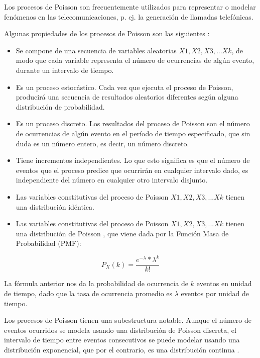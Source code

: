 Los procesos de Poisson son frecuentemente utilizados para representar o modelar fenómenos en las telecomunicaciones, p. ej. la generación de llamadas telefónicas.\newline

Algunas propiedades de los procesos de Poisson son las siguientes \parencite{ PoissonMedium}:

\begin{itemize}
    \item Se compone de una secuencia de variables aleatorias $X1, X2, X3, ... Xk$, de modo que cada variable representa el número de ocurrencias de algún evento, durante un intervalo de tiempo.
    \item Es un proceso estocástico. Cada vez que ejecuta el proceso de Poisson, producirá una secuencia de resultados aleatorios diferentes según alguna distribución de probabilidad.
    \item Es un proceso discreto. Los resultados del proceso de Poisson son el número de ocurrencias de algún evento en el período de tiempo especificado, que sin duda es un número entero, es decir, un número discreto.
    \item Tiene incrementos independientes. Lo que esto significa es que el número de eventos que el proceso predice que ocurrirán en cualquier intervalo dado, es independiente del número en cualquier otro intervalo disjunto.
    \item Las variables constitutivas del proceso de Poisson $X1, X2, X3, ... Xk$ tienen una distribución idéntica.
    \item Las variables constitutivas del proceso de Poisson $X1, X2, X3, ... Xk$ tienen una distribución de Poisson , que viene dada por la Función Masa de Probabilidad (PMF):
\end{itemize}

\begin{equation}
    P_{X}(k)=\frac{e^{-\lambda}*\lambda ^{k}}{k!}
    \label{eqn:Poisson}
\end{equation}

La fórmula anterior nos da la probabilidad de ocurrencia de $k$ eventos en unidad de tiempo, dado que la tasa de ocurrencia promedio es $\lambda$ eventos por unidad de tiempo.\newline

Los procesos de Poisson tienen una subestructura notable. Aunque el número de eventos ocurridos se modela usando una distribución de Poisson discreta, el intervalo de tiempo entre eventos consecutivos se puede modelar usando una distribución exponencial, que por el contrario, es una distribución continua \parencite{PoissonMedium}.\newline

